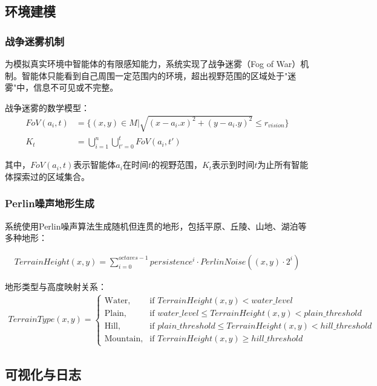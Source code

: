 \documentclass[12pt,a4paper]{article}
\begin{document}
\subsection{环境建模}

\subsubsection{战争迷雾机制}

为模拟真实环境中智能体的有限感知能力，系统实现了战争迷雾（Fog of War）机制。智能体只能看到自己周围一定范围内的环境，超出视野范围的区域处于"迷雾"中，信息不可见或不完整。

战争迷雾的数学模型：
\begin{align}
FoV(a_i, t) &= \{(x,y) \in M | \sqrt{(x-a_i.x)^2 + (y-a_i.y)^2} \leq r_{vision}\} \\
K_t &= \bigcup_{i=1}^{n} \bigcup_{t'=0}^{t} FoV(a_i, t')
\end{align}

其中，$FoV(a_i, t)$表示智能体$a_i$在时间$t$的视野范围，$K_t$表示到时间$t$为止所有智能体探索过的区域集合。

\subsubsection{Perlin噪声地形生成}

系统使用Perlin噪声算法生成随机但连贯的地形，包括平原、丘陵、山地、湖泊等多种地形：

\begin{align}
TerrainHeight(x,y) = \sum_{i=0}^{octaves-1} persistence^i \cdot PerlinNoise((x,y) \cdot 2^i)
\end{align}

地形类型与高度映射关系：
\begin{align}
TerrainType(x,y) = 
\begin{cases}
\text{Water}, & \text{if } TerrainHeight(x,y) < water\_level \\
\text{Plain}, & \text{if } water\_level \leq TerrainHeight(x,y) < plain\_threshold \\
\text{Hill}, & \text{if } plain\_threshold \leq TerrainHeight(x,y) < hill\_threshold \\
\text{Mountain}, & \text{if } TerrainHeight(x,y) \geq hill\_threshold
\end{cases}
\end{align}

\subsection{可视化与日志}
\end{document}
